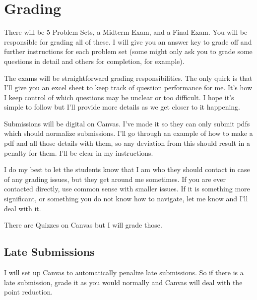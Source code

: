 \documentclass[11pt]{article}
\begin{document}

\section*{Grading}
There will be 5 Problem Sets, a Midterm Exam, and a Final Exam.
You will be responsible for grading all of these. 
I will give you an answer key to grade off and further instructions for each problem set (some might only ask you to grade some questions in detail and others for completion, for example). 

The exams will be straightforward grading responsibilities. 
The only quirk is that I'll give you an excel sheet to keep track of question performance for me. 
It's how I keep control of which questions may be unclear or too difficult. 
I hope it's simple to follow but I'll provide more details as we get closer to it happening. 

Submissions will be digital on Canvas. 
I've made it so they can only submit pdfs which should normalize submissions. 
I'll go through an example of how to make a pdf and all those details with them, so any deviation from this should result in a penalty for them. 
I'll be clear in my instructions. 

I do my best to let the students know that I am who they should contact in case of any grading issues, but they get around me sometimes. 
If you are ever contacted directly, use common sense with smaller issues. 
If it is something more significant, or something you do not know how to navigate, let me know and I'll deal with it. 

There are Quizzes on Canvas but I will grade those. 

\subsection*{Late Submissions}
I will set up Canvas to automatically penalize late submissions.
So if there is a late submission, grade it as you would normally and Canvas will deal with the point reduction. 

\newpage

%


\end{document}
